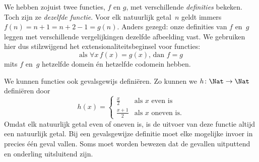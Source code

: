 \documentclass[../../../include/open-logic-section]{subfiles}
\begin{document}
\begin{explain}
We hebben zojuist twee functies, $f$ en $g$, met verschillende
\emph{definities} bekeken. Toch zijn ze \emph{dezelfde functie}. Voor elk
natuurlijk getal~$n$ geldt immers $f(n) = n+1 = n+2-1 =
g(n)$. Anders gezegd: onze definities van $f$ en~$g$ leggen met verschillende
vergelijkingen dezelfde afbeelding vast. We gebruiken hier dus stilzwijgend
het extensionaliteitsbeginsel voor functies:
\[
  \text{als }\forall x\, f(x) = g(x)\text{, dan }f = g
\]
mits $f$ en~$g$ hetzelfde domein én hetzelfde codomein hebben.
\end{explain}

\begin{ex}
We kunnen functies ook gevalsgewijs definiëren. Zo kunnen we
$h \colon \Nat \to \Nat$ definiëren door
\[
h(x) =
\begin{cases}
  \frac{x}{2} & \text{als $x$ even is} \\
  \frac{x+1}{2} & \text{als $x$ oneven is.}
\end{cases}
\]
Omdat elk natuurlijk getal even of oneven is, is de uitvoer van deze functie
altijd een natuurlijk getal. Bij een gevalsgewijze definitie moet elke
mogelijke invoer in precies één geval vallen. Soms moet worden bewezen dat de
gevallen uitputtend en onderling uitsluitend zijn.
\end{ex}
\end{document}
